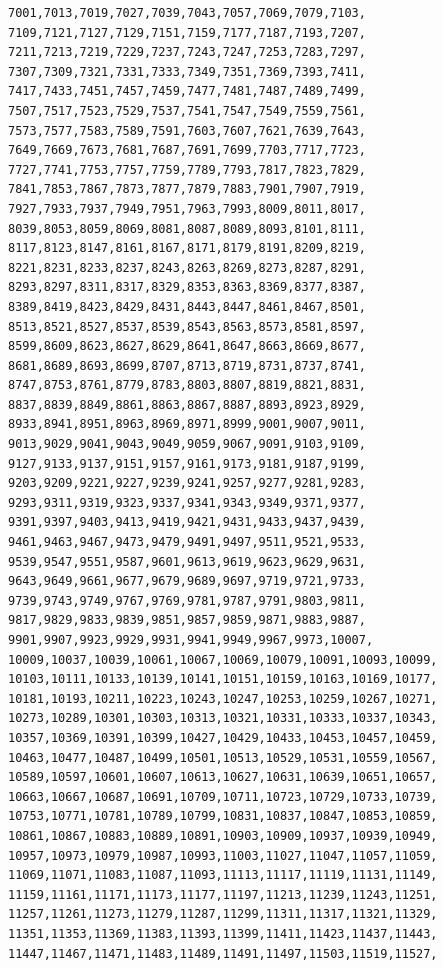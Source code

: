 \documentclass{article}
\begin{document}
\begin{lstlisting}[caption=\texttt{maths.lib}]
7001,7013,7019,7027,7039,7043,7057,7069,7079,7103,
7109,7121,7127,7129,7151,7159,7177,7187,7193,7207,
7211,7213,7219,7229,7237,7243,7247,7253,7283,7297,
7307,7309,7321,7331,7333,7349,7351,7369,7393,7411,
7417,7433,7451,7457,7459,7477,7481,7487,7489,7499,
7507,7517,7523,7529,7537,7541,7547,7549,7559,7561,
7573,7577,7583,7589,7591,7603,7607,7621,7639,7643,
7649,7669,7673,7681,7687,7691,7699,7703,7717,7723,
7727,7741,7753,7757,7759,7789,7793,7817,7823,7829,
7841,7853,7867,7873,7877,7879,7883,7901,7907,7919,
7927,7933,7937,7949,7951,7963,7993,8009,8011,8017,
8039,8053,8059,8069,8081,8087,8089,8093,8101,8111,
8117,8123,8147,8161,8167,8171,8179,8191,8209,8219,
8221,8231,8233,8237,8243,8263,8269,8273,8287,8291,
8293,8297,8311,8317,8329,8353,8363,8369,8377,8387,
8389,8419,8423,8429,8431,8443,8447,8461,8467,8501,
8513,8521,8527,8537,8539,8543,8563,8573,8581,8597,
8599,8609,8623,8627,8629,8641,8647,8663,8669,8677,
8681,8689,8693,8699,8707,8713,8719,8731,8737,8741,
8747,8753,8761,8779,8783,8803,8807,8819,8821,8831,
8837,8839,8849,8861,8863,8867,8887,8893,8923,8929,
8933,8941,8951,8963,8969,8971,8999,9001,9007,9011,
9013,9029,9041,9043,9049,9059,9067,9091,9103,9109,
9127,9133,9137,9151,9157,9161,9173,9181,9187,9199,
9203,9209,9221,9227,9239,9241,9257,9277,9281,9283,
9293,9311,9319,9323,9337,9341,9343,9349,9371,9377,
9391,9397,9403,9413,9419,9421,9431,9433,9437,9439,
9461,9463,9467,9473,9479,9491,9497,9511,9521,9533,
9539,9547,9551,9587,9601,9613,9619,9623,9629,9631,
9643,9649,9661,9677,9679,9689,9697,9719,9721,9733,
9739,9743,9749,9767,9769,9781,9787,9791,9803,9811,
9817,9829,9833,9839,9851,9857,9859,9871,9883,9887,
9901,9907,9923,9929,9931,9941,9949,9967,9973,10007,
10009,10037,10039,10061,10067,10069,10079,10091,10093,10099,
10103,10111,10133,10139,10141,10151,10159,10163,10169,10177,
10181,10193,10211,10223,10243,10247,10253,10259,10267,10271,
10273,10289,10301,10303,10313,10321,10331,10333,10337,10343,
10357,10369,10391,10399,10427,10429,10433,10453,10457,10459,
10463,10477,10487,10499,10501,10513,10529,10531,10559,10567,
10589,10597,10601,10607,10613,10627,10631,10639,10651,10657,
10663,10667,10687,10691,10709,10711,10723,10729,10733,10739,
10753,10771,10781,10789,10799,10831,10837,10847,10853,10859,
10861,10867,10883,10889,10891,10903,10909,10937,10939,10949,
10957,10973,10979,10987,10993,11003,11027,11047,11057,11059,
11069,11071,11083,11087,11093,11113,11117,11119,11131,11149,
11159,11161,11171,11173,11177,11197,11213,11239,11243,11251,
11257,11261,11273,11279,11287,11299,11311,11317,11321,11329,
11351,11353,11369,11383,11393,11399,11411,11423,11437,11443,
11447,11467,11471,11483,11489,11491,11497,11503,11519,11527,

\end{lstlisting}
\end{document}
